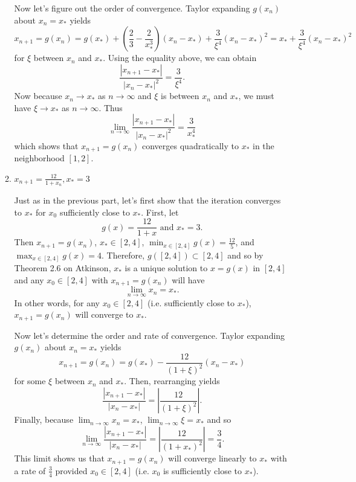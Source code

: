 \documentclass[a4paper,12pt]{article}
\newcommand{\abs}[1]{\left| #1 \right|}
\begin{document}
\begin{enumerate}[label = \arabic*.]
\begin{enumerate}[label = \roman*.]
			Now let's figure out the order of convergence. Taylor expanding $ g(x_n) $ about $ x_n = x_* $ yields
			\[
				x_{n+1} = g(x_n) = g(x_*) + \left(\frac{2}{3} - \frac{2}{x_*^3}\right)(x_n - x_*) + \frac{3}{\xi^4}(x_n - x_*)^2 = x_* + \frac{3}{\xi^4}(x_n - x_*)^2
			\]
			 for $ \xi $ between $ x_n $ and $ x_* $. Using the equality above, we can obtain
			\[
				\frac{\abs{x_{n+1} - x_*}}{\abs{x_n - x_*}^2} = \frac{3}{\xi^4}.
			\]
			Now because $ x_n \to x_* $ as $ n \to \infty $ and $ \xi $ is between $ x_n $ and $ x_* $, we must have $ \xi \to x_* $ as $ n \to \infty $. Thus
			\[
				\lim_{n \to \infty} \frac{\abs{x_{n+1} - x_*}}{\abs{x_n - x_*}^2} = \frac{3}{x_*^4}
			\]
			which shows that $ x_{n+1} = g(x_n) $ converges quadratically to $ x_* $ in the neighborhood $ [1,2] $.
			
			
			\item $ x_{n+1} = \frac{12}{1+x_n}, x_* = 3 $
			
			Just as in the previous part, let's first show that the iteration converges to $ x_* $ for $ x_0 $ sufficiently close to $ x_* $. First, let
			\[
				g(x) = \frac{12}{1+x} \text{ and } x_* = 3.
			\]
			Then $ x_{n+1} = g(x_n) $, $ x_* \in [2,4] $, $ \min_{x \in [2,4]}g(x) = \frac{12}{5} $, and $ \max_{x \in [2,4]} g(x) = 4$. Therefore, $ g([2,4]) \subset [2,4] $ and so by Theorem 2.6 on Atkinson, $ x_* $ is a unique solution to $ x = g(x) $ in $ [2,4] $ and any $ x_0 \in [2,4] $ with $ x_{n+1} = g(x_n)$ will have
			\[
				\lim_{n \to \infty}x_n = x_*.
			\]
			In other words, for any $ x_0 \in [2,4] $ (i.e. sufficiently close to $ x_* $), $ x_{n+1} = g(x_n) $ will converge to $ x_* $.
			
			Now let's determine the order and rate of convergence. Taylor expanding $ g(x_n) $ about $ x_n = x_* $ yields
			\[
				x_{n+1} = g(x_n) = g(x_*) - \frac{12}{(1+\xi)^2}(x_n - x_*)
			\]
			for some $ \xi $ between $ x_n $ and $ x_* $. Then, rearranging yields
			\[
				\frac{\abs{x_{n +1} - x_*}}{\abs{x_n - x_*}} = \abs{\frac{12}{(1 + \xi)^2}}.
			\]
			Finally, because $ \lim_{n\to\infty} x_n = x_*$, $  $$\lim_{n\to\infty} \xi = x_*$ and so
			\[
				\lim_{n \to \infty} \frac{\abs{x_{n +1} - x_*}}{\abs{x_n - x_*}} = \abs{\frac{12}{(1 + x_*)^2}} = \frac{3}{4}.
			\]
			This limit shows us that $ x_{n+1} = g(x_n) $ will converge linearly to $ x_* $ with a rate of $ \frac{3}{4} $ provided $ x_0 \in [2,4] $ (i.e. $ x_0 $ is sufficiently close to $ x_* $).
		\end{enumerate}
	

\end{enumerate}
\end{document}
